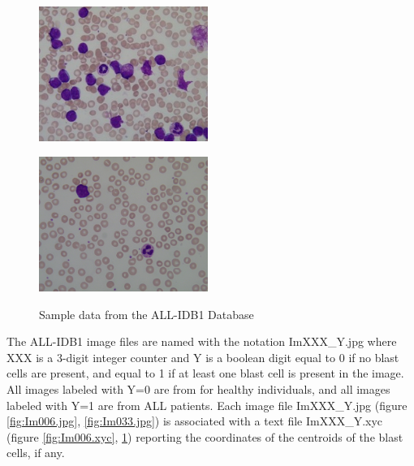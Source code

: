\begin{figure}[H]
\begin{minipage}[b]{0.35\linewidth}
\centering
\includegraphics[width=55mm]{../images/Im006_1.jpg}
\label{fig:Im006.jpg}
\end{minipage}
\hfill
\begin{minipage}[b]{0.3\linewidth}
\centering

\label{fig:Im006.xyc}
\end{minipage}

\begin{minipage}[b]{0.35\linewidth}
\centering
\includegraphics[width=55mm]{../images/Im033_1.jpg}
\label{fig:Im033.jpg}
\end{minipage}
\hfill
\begin{minipage}[b]{0.3\linewidth}
\centering

\label{fig:Im033.xyc}
\end{minipage}
\caption{Sample data from the ALL-IDB1 Database}
\end{figure}

The ALL-IDB1 image files are named with the notation ImXXX\_Y.jpg where XXX is a 3-digit integer counter and Y is a boolean digit equal to 0 if no blast cells are present, and equal to 1 if at least one blast cell is present in the image. All images labeled with Y=0 are from for healthy individuals, and all images labeled with Y=1 are from ALL patients. Each image file ImXXX\_Y.jpg (figure \ref{fig:Im006.jpg}, \ref{fig:Im033.jpg}) is associated with a text file ImXXX\_Y.xyc (figure \ref{fig:Im006.xyc}, \ref{fig:Im033.xyc}) reporting the coordinates of the centroids of the blast cells, if any.\\

